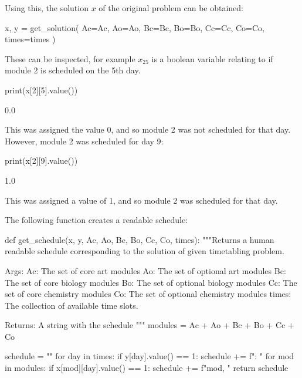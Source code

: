 Using this, the solution \(x\) of the original problem can be obtained:

\begin{pyin}
x, y = get_solution(
    Ac=Ac, Ao=Ao, Bc=Bc, Bo=Bo, Cc=Cc, Co=Co, times=times
)
\end{pyin}

These can be
inspected, for example \(x_{25}\) is a boolean variable relating to if module 2
is scheduled on the 5th day.

\begin{pyin}
print(x[2][5].value())
\end{pyin}

\begin{pyout}
0.0
\end{pyout}

This was assigned the value 0, and so module 2 was not scheduled for that day.
However, module 2 was scheduled for day 9:

\begin{pyin}
print(x[2][9].value())
\end{pyin}

\begin{pyout}
1.0
\end{pyout}

This was assigned a value of 1, and so module 2 was scheduled for that day.

The following function creates a readable schedule:

\begin{pyin}
def get_schedule(x, y, Ac, Ao, Bc, Bo, Cc, Co, times):
    """Returns a human readable schedule corresponding to the
    solution of given timetabling problem.

    Args:
        Ac: The set of core art modules
        Ao: The set of optional art modules
        Bc: The set of core biology modules
        Bo: The set of optional biology modules
        Cc: The set of core chemistry modules
        Co: The set of optional chemistry modules
        times: The collection of available time slots.

    Returns:
        A string with the schedule
    """
    modules = Ac + Ao + Bc + Bo + Cc + Co

    schedule = ""
    for day in times:
        if y[day].value() == 1:
            schedule += f": "
            for mod in modules:
                if x[mod][day].value() == 1:
                    schedule += f"{mod}, "
    return schedule
\end{pyin}

